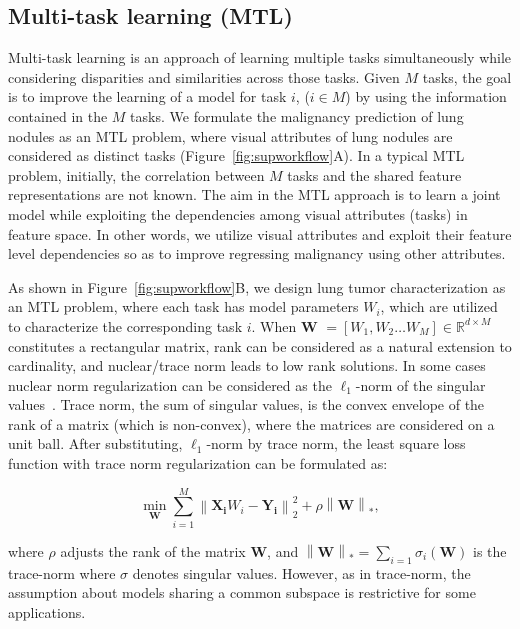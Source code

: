 \documentclass[journal]{IEEEtran}
\DeclareMathOperator*{\minimum}{min}
\begin{document}
\subsection{Multi-task learning (MTL)}
Multi-task learning is an approach of learning multiple tasks simultaneously while considering disparities and similarities across those tasks. Given $M$  tasks, the goal is to improve the learning of a model for task $i$, ($i\in M$) by using the information contained in the $M$ tasks. We formulate the malignancy prediction of lung nodules as an MTL problem, where visual attributes of lung nodules are considered as distinct tasks (Figure~\ref{fig:supworkflow}A). In a typical MTL problem, initially, the correlation between $M$ tasks and the shared feature representations are not known. The aim in the MTL approach is to learn a joint model while exploiting the dependencies among visual attributes (tasks) in feature space. In other words, we utilize visual attributes and exploit their feature level dependencies so as to improve regressing malignancy using other attributes.


As shown in Figure~\ref{fig:supworkflow}B, we design lung tumor characterization as an MTL problem, where each task has model parameters $W_i$, which are utilized to characterize the corresponding task $i$. When $\textbf{W}$ $=[W_1,W_2 \dots W_M] \in\mathbb{R}^{d \times M}$ constitutes a rectangular matrix, rank can be considered as a natural extension to cardinality, and nuclear/trace norm leads to low rank solutions. In some cases nuclear norm regularization can be considered as the $\ell_1$-norm of the singular values~\cite{recht2010guaranteed}. Trace norm, the sum of singular values, is the convex envelope of the rank of a matrix (which is non-convex), where the matrices are considered on a unit ball. After substituting, $\ell_1$-norm by trace norm, the least square loss function with trace norm regularization can be formulated as:

\begin{equation}
\minimum_{\mathbf{W}}\sum_{i=1}^{M} \left \|\mathbf{X_i}W_i-\mathbf{Y_i}  \right \|_{2}^{2}+\rho\left \| \mathbf{W} \right \|_{*},
\label{eq:mtltrace}
\end{equation}

\noindent where $\rho$ adjusts the rank of the matrix \textbf{W}, and $\left \| \mathbf{W} \right \|_{*}=\sum_{i=1}\sigma_i(\mathbf{W})$ is the trace-norm where $\sigma$ denotes singular values. However, as in trace-norm, the assumption about models sharing a common subspace is restrictive for some applications.
\end{document}

